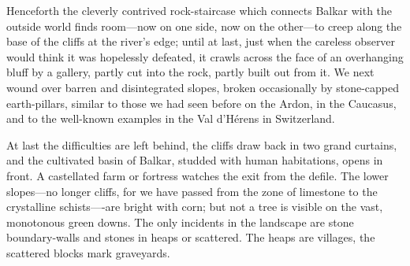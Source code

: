 \documentclass{article}
\begin{document}
	Henceforth the cleverly contrived rock-staircase which connects Balkar with the outside world finds room—now on one side, now on the other—to creep along the base of the cliffs at the river's edge; until at last, just when the careless observer would think it was hopelessly defeated, it crawls across the face of an overhanging bluff by a gallery, partly cut into the rock, partly built out from it. We next wound over barren and disintegrated slopes, broken occasionally by stone-capped earth-pillars, similar to those we had seen before on the Ardon, in the Caucasus, and to the well-known examples in the Val d'Hérens in Switzerland.
	
	At last the difficulties are left behind, the cliffs draw back in two grand curtains, and the cultivated basin of Balkar, studded with human habitations, opens in front. A castellated farm or fortress watches the exit from the defile. The lower slopes—no longer cliffs, for we have passed from the zone of limestone to the crystalline schists—-are bright with corn; but not a tree is visible on the vast, monotonous green downs. The only incidents in the landscape are stone boundary-walls and stones in heaps or scattered. The heaps are villages, the scattered blocks mark graveyards.
	
\end{document}

